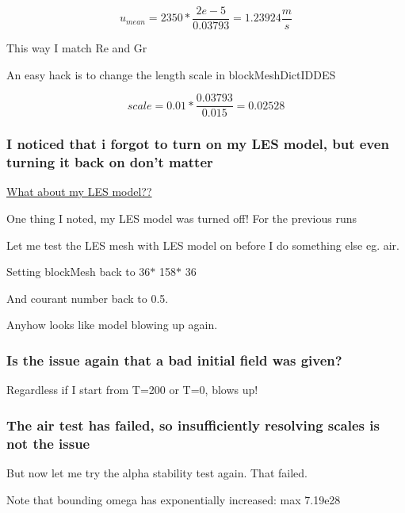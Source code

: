 \documentclass[12pt]{article}
\renewcommand{\_}{\kern-1.5pt\textunderscore\kern-1.5pt}
\begin{document}
 \[ u_{mean}=2350\ast\frac{2e-5}{0.03793}=1.23924\frac{m}{s} \] \par

This way I match Re and Gr\par

An easy hack is to change the length scale in blockMeshDictIDDES\par

 \[ scale=0.01\ast\frac{0.03793}{0.015}=0.02528 \] \par


\subsubsection{I noticed that i forgot to turn on my LES model, but even turning it back on don't matter}
\uline{What about my LES model??}\par

One thing I noted, my LES model was turned off! For the previous runs\par

Let me test the LES mesh with LES model on before I do something else eg. air.\par

Setting blockMesh back to 36$\ast$ 158$\ast$ 36\par

And courant number back to 0.5.\par


\vspace{\baselineskip}
Anyhow looks like model blowing up again.\par

\subsubsection{Is the issue again that a bad initial field was given?}

Regardless if I start from T=200 or T=0, blows up!\par


\subsubsection{The air test has failed, so insufficiently resolving scales is not the issue}
But now let me try the alpha stability test again. That failed.\par

Note that bounding omega has exponentially increased: max 7.19e28\par
\end{document}
